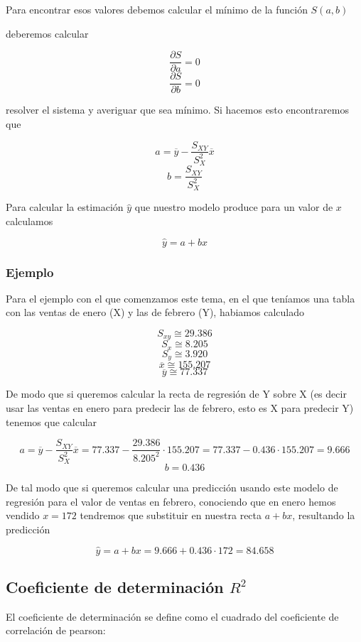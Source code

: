 \documentclass[
]{article}
\begin{document}
Para encontrar esos valores debemos calcular el mínimo de la función
\(S(a,b)\)

deberemos calcular

\[\frac {\partial S}{\partial a}=0\]
\[\frac {\partial S}{\partial b}=0\]

resolver el sistema y averiguar que sea mínimo. Si hacemos esto
encontraremos que

\[a = \overline{y} - \frac{S_{XY}}{S^2_X} \overline x\]
\[b = \frac{S_{XY}}{S^2_X}\]

Para calcular la estimación \(\hat y\) que nuestro modelo produce para
un valor de \(x\) calculamos

\[\hat y = a + b x\]

\hypertarget{ejemplo-2}{%
\subsubsection{Ejemplo}\label{ejemplo-2}}

Para el ejemplo con el que comenzamos este tema, en el que teníamos una
tabla con las ventas de enero (X) y las de febrero (Y), habiamos
calculado

\[S_{xy} \cong 29.386\] \[S_x \cong 8.205\] \[S_y \cong 3.920\]
\[\overline x \cong155.207\] \[\overline y \cong77.337 \]

De modo que si queremos calcular la recta de regresión de Y sobre X (es
decir usar las ventas en enero para predecir las de febrero, esto es X
para predecir Y) tenemos que calcular

\[a = \overline{y} - \frac{S_{XY}}{S^2_X} \overline x = 77.337 - \frac{29.386}{8.205^2}\cdot 155.207 = 77.337 - 0.436 \cdot 155.207 = 9.666\]
\[b = 0.436\]

De tal modo que si queremos calcular una predicción usando este modelo
de regresión para el valor de ventas en febrero, conociendo que en enero
hemos vendido \(x=172\) tendremos que substituir en nuestra recta
\(a + bx\), resultando la predicción

\[\hat y = a+bx = 9.666 + 0.436 \cdot 172 = 84.658\]

\hypertarget{coeficiente-de-determinaciuxf3n-r2}{%
\subsection{\texorpdfstring{Coeficiente de determinación
\(R^2\)}{Coeficiente de determinación R\^{}2}}\label{coeficiente-de-determinaciuxf3n-r2}}

El coeficiente de determinación se define como el cuadrado del
coeficiente de correlación de pearson:
\end{document}
